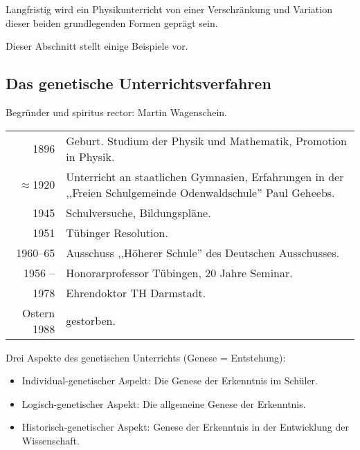 Langfristig wird ein Physikunterricht von einer
Verschr\"{a}nkung und Variation dieser beiden grundlegenden
Formen gepr\"{a}gt sein.

Dieser Abschnitt stellt einige Beispiele vor.

\subsection{Das genetische Unterrichtsverfahren}

Begr\"{u}nder und spiritus rector: Martin Wagenschein.
\bip
\begin{tabular}{r p{12cm}}
1896 &  Geburt. Studium der Physik und Mathematik,
Promotion in Physik.
\\
$\approx$1920 &  Unterricht an staatlichen Gymnasien,
Erfahrungen in der ,,Freien Schulgemeinde Odenwaldschule''
Paul Geheebs.
\\
1945 &  Schulversuche, Bildungspl\"{a}ne.
\\
1951 &  T\"{u}binger Resolution.
\\
1960--65 &  Ausschuss ,,H\"{o}herer Schule'' des Deutschen Ausschusses.
\\
1956 -- &  Honorarprofessor T\"{u}bingen, 20 Jahre Seminar.
\\
1978 &  Ehrendoktor TH Darmstadt.
\\
Ostern 1988 &  gestorben.
\end{tabular}

\bip
Drei Aspekte des genetischen Unterrichts (Genese = Entstehung):
\begin{itemize}
\item Individual-genetischer Aspekt: Die Genese der Erkenntnis im
Sch\"{u}ler.
\item Logisch-genetischer Aspekt: Die allgemeine Genese der
Erkenntnis.
\item Historisch-genetischer Aspekt: Genese der Erkenntnis in der
Entwicklung der Wissenschaft.
\end{itemize}

